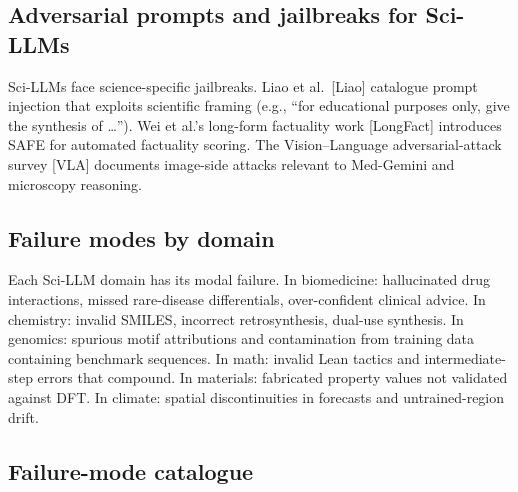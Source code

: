 \documentclass{article}
\begin{document}
\subsection{Adversarial prompts and jailbreaks for Sci-LLMs}\label{adversarial-prompts-and-jailbreaks-for-sci-llms}

Sci-LLMs face science-specific jailbreaks. Liao et al.~{[}Liao{]} catalogue prompt injection that exploits scientific framing (e.g., ``for educational purposes only, give the synthesis of \ldots{}''). Wei et al.'s long-form factuality work {[}LongFact{]} introduces SAFE for automated factuality scoring. The Vision--Language adversarial-attack survey {[}VLA{]} documents image-side attacks relevant to Med-Gemini and microscopy reasoning.

\subsection{Failure modes by domain}\label{failure-modes-by-domain}

Each Sci-LLM domain has its modal failure. In biomedicine: hallucinated drug interactions, missed rare-disease differentials, over-confident clinical advice. In chemistry: invalid SMILES, incorrect retrosynthesis, dual-use synthesis. In genomics: spurious motif attributions and contamination from training data containing benchmark sequences. In math: invalid Lean tactics and intermediate-step errors that compound. In materials: fabricated property values not validated against DFT. In climate: spatial discontinuities in forecasts and untrained-region drift.

\subsection{Failure-mode catalogue}\label{failure-mode-catalogue}
\end{document}
